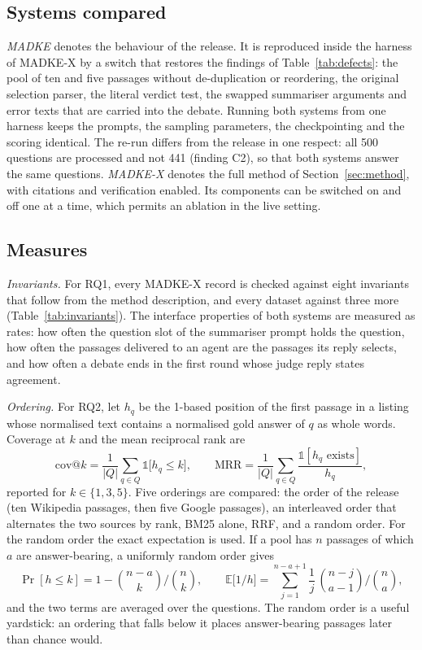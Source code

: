 \subsection{Systems compared}
\emph{MADKE} denotes the behaviour of the release. It is reproduced inside the harness of MADKE-X by a switch that restores the findings of Table~\ref{tab:defects}: the pool of ten and five passages without de-duplication or reordering, the original selection parser, the literal verdict test, the swapped summariser arguments and error texts that are carried into the debate. Running both systems from one harness keeps the prompts, the sampling parameters, the checkpointing and the scoring identical. The re-run differs from the release in one respect: all 500 questions are processed and not 441 (finding C2), so that both systems answer the same questions. \emph{MADKE-X} denotes the full method of Section~\ref{sec:method}, with citations and verification enabled. Its components can be switched on and off one at a time, which permits an ablation in the live setting.

\subsection{Measures}
\emph{Invariants.} For RQ1, every MADKE-X record is checked against eight invariants that follow from the method description, and every dataset against three more (Table~\ref{tab:invariants}). The interface properties of both systems are measured as rates: how often the question slot of the summariser prompt holds the question, how often the passages delivered to an agent are the passages its reply selects, and how often a debate ends in the first round whose judge reply states agreement.

\emph{Ordering.} For RQ2, let $h_q$ be the 1-based position of the first passage in a listing whose normalised text contains a normalised gold answer of $q$ as whole words. Coverage at $k$ and the mean reciprocal rank are
\begin{equation}
\mathrm{cov@}k = \frac{1}{|Q|}\sum_{q\in Q}\mathbb{1}\big[h_q\le k\big],
\qquad
\mathrm{MRR} = \frac{1}{|Q|}\sum_{q\in Q}\frac{\mathbb{1}[h_q \text{ exists}]}{h_q},
\label{eq:cov}
\end{equation}
reported for $k\in\{1,3,5\}$. Five orderings are compared: the order of the release (ten Wikipedia passages, then five Google passages), an interleaved order that alternates the two sources by rank, BM25 alone, RRF, and a random order. For the random order the exact expectation is used. If a pool has $n$ passages of which $a$ are answer-bearing, a uniformly random order gives
\begin{equation}
\Pr[h\le k] = 1-\binom{n-a}{k}\Big/\binom{n}{k},
\qquad
\mathbb{E}\big[1/h\big] = \sum_{j=1}^{n-a+1}\frac{1}{j}\,\binom{n-j}{a-1}\Big/\binom{n}{a},
\label{eq:random}
\end{equation}
and the two terms are averaged over the questions. The random order is a useful yardstick: an ordering that falls below it places answer-bearing passages later than chance would.

